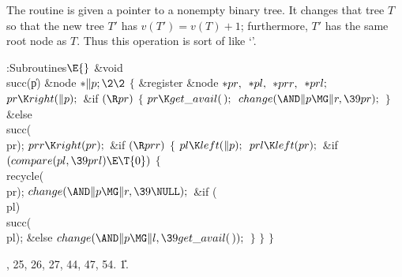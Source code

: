 The  routine is given a pointer to a nonempty binary tree.
It changes that tree $T$ so that the new tree $T'$ has $v(T')=v(T)+1$;
furthermore, $T'$ has the same root node as $T$. Thus this operation
is sort of like `'.

\Y\B\4:Subroutines\X${}\E{}$\6
\&{void} \\{succ}(\|p)\1\1\6
\&{node} ${}{*}\|p;\2\2{}$\6
${}\{{}$\1\6
\&{register} \&{node} ${}{*}\\{pr},{}$ ${}{*}\\{pl},{}$ ${}{*}\\{prr},{}$
${}{*}\\{prl};{}$\7
${}\\{pr}\K\\{right}(\|p);{}$\6
\&{if} ${}(\R\\{pr}){}$\5
${}\{{}$\1\6
${}\\{pr}\K\\{get\_avail}(\,);{}$\6
${}\\{change}({\AND}\|p\MG\|r,\39\\{pr});{}$\6
\4${}\}{}$\2\6
\&{else}\1\5
\\{succ}(\\{pr});\2\6
${}\\{prr}\K\\{right}(\\{pr});{}$\6
\&{if} ${}(\R\\{prr}){}$\5
${}\{{}$\1\6
${}\\{pl}\K\\{left}(\|p);{}$\6
${}\\{prl}\K\\{left}(\\{pr});{}$\6
\&{if} ${}(\\{compare}(\\{pl},\39\\{prl})\E\T{0}){}$\5
${}\{{}$\1\6
\\{recycle}(\\{pr});\6
${}\\{change}({\AND}\|p\MG\|r,\39\NULL);{}$\6
\&{if} (\\{pl})\1\5
\\{succ}(\\{pl});\2\6
\&{else}\1\5
${}\\{change}({\AND}\|p\MG\|l,\39\\{get\_avail}(\,));{}$\2\6
\4${}\}{}$\2\6
\4${}\}{}$\2\6
\4${}\}{}$\2\par
{}, 25, 26, 27, 44, 47, 54.
\U1.\fi

